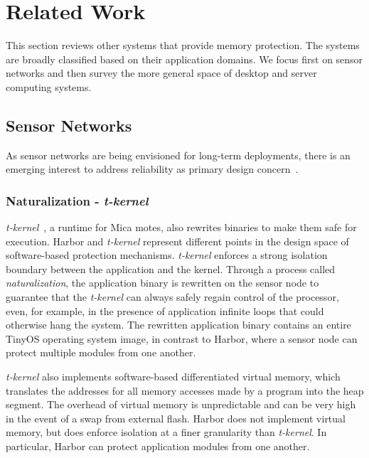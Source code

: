 \section{Related Work}
\label{sec:related}
%
This section reviews other systems that provide memory protection.
%
The systems are broadly classified based on their application
domains.
%
We focus first on sensor networks and then survey the more general
space of desktop and server computing systems.
%
\subsection{Sensor Networks}
%
As sensor networks are being envisioned for long-term deployments,
there is an emerging interest to address reliability as primary design
concern~\cite{tkernel06sensys,regehr06utos,dutta05ipsn}.
\subsubsection{Naturalization - \emph{t-kernel}}
%
\emph{t-kernel}~\cite{tkernel06sensys}, a runtime for Mica motes, also
rewrites binaries to make them safe for execution.
%
Harbor and \emph{t-kernel} represent different points in the design space of
software-based protection mechanisms.
%
\emph{t-kernel} enforces a strong isolation boundary between the application and
the kernel.
%
Through a process called \emph{naturalization}, the application binary is
rewritten on the sensor node to guarantee that the \emph{t-kernel} can
always safely regain control of the processor, even, for example, in the
presence of application infinite loops that could otherwise hang the
system.
%
The rewritten application binary contains an entire TinyOS operating system
image, in contrast to Harbor, where a sensor node can protect multiple
modules from one another.
%


\emph{t-kernel} also implements software-based differentiated
virtual memory,
%
which translates the addresses for all memory accesses made by a program
into the heap segment.
%
The overhead of virtual memory is unpredictable and can be very
high in the event of a swap from external flash.
%
Harbor does not implement virtual memory, but does enforce isolation at a
finer granularity than \emph{t-kernel}.
%
In particular, Harbor can protect application modules from
one another.
%

